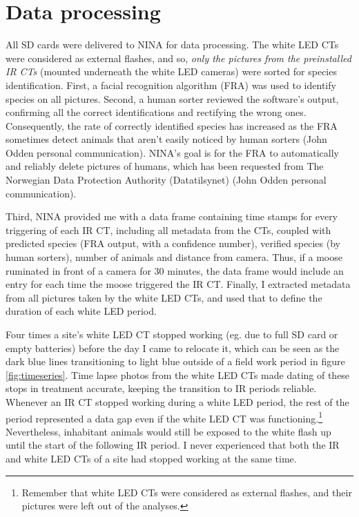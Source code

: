 \section{Data processing} 

All SD cards were delivered to NINA for data processing.
The white LED CTs were considered as external flashes, and so, \textit{only the pictures from the preinstalled IR CTs} (mounted underneath the white LED cameras) %
were sorted for species identification.
First, a facial recognition algorithm (FRA) was used to identify species on all pictures. %
Second, a human sorter reviewed the software's output, confirming all the correct identifications and rectifying the wrong ones. 
Consequently, the rate of correctly identified species has increased as the FRA sometimes detect animals that aren't easily noticed by human sorters (John Odden personal communication). 
NINA's goal is for the FRA to automatically and reliably delete pictures of humans, which has been requested from The Norwegian Data Protection Authority (Datatilsynet) (John Odden personal communication).

Third, NINA provided me with a data frame containing time stamps for every triggering of each IR CT, including all metadata from the CTs, coupled with predicted species (FRA output, with a confidence number), verified species (by human sorters), number of animals and distance from camera.
Thus, if a moose ruminated in front of a camera for 30 minutes, the data frame would include an entry for each time the moose triggered the IR CT. 
Finally, I extracted metadata from all pictures taken by the white LED CTs, and used that to define the duration of each white LED period.

Four times a site's white LED CT stopped working (eg. due to full SD card or empty batteries) before the day I came to relocate it, which can be seen as the dark blue lines transitioning to light blue outside of a field work period in figure \ref{fig:timeseries}.
Time lapse photos from the white LED CTs made dating of these stops in treatment accurate, keeping the transition to IR periods reliable. 
Whenever an IR CT stopped working during a white LED period, the rest of the period represented a data gap even if the white LED CT was functioning.\footnote{Remember that white LED CTs were considered as external flashes, and their pictures were left out of the analyses.} 
Nevertheless, inhabitant animals would still be exposed to the white flash up until the start of the following IR period.
I never experienced that both the IR and white LED CTs of a site had stopped working at the same time. 


